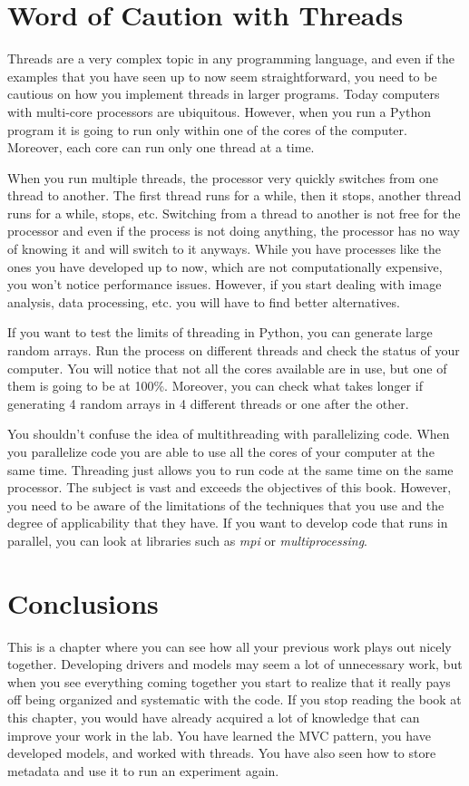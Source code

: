 \section{Word of Caution with Threads}\label{word-of-caution-withthreads}

Threads are a very complex topic in any programming language, and even
if the examples that you have seen up to now seem straightforward, you
need to be cautious on how you implement threads in larger programs.
Today computers with multi-core processors are ubiquitous. However, when
you run a Python program it is going to run only within one of the cores
of the computer. Moreover, each core can run only one thread at a time.

When you run multiple threads, the processor very quickly switches from
one thread to another. The first thread runs for a while, then it stops,
another thread runs for a while, stops, etc. Switching from a thread to
another is not free for the processor and even if the process is not
doing anything, the processor has no way of knowing it and will switch
to it anyways. While you have processes like the ones you have developed
up to now, which are not computationally expensive, you won't notice
performance issues. However, if you start dealing with image analysis,
data processing, etc. you will have to find better alternatives.

If you want to test the limits of threading in Python, you can generate
large random arrays. Run the process on different threads and check the
status of your computer. You will notice that not all the cores
available are in use, but one of them is going to be at 100\%. Moreover,
you can check what takes longer if generating 4 random arrays in 4
different threads or one after the other.

You shouldn't confuse the idea of multithreading with parallelizing
code. When you parallelize code you are able to use all the cores of
your computer at the same time. Threading just allows you to run code at
the same time on the same processor. The subject is vast and exceeds the
objectives of this book. However, you need to be aware of the
limitations of the techniques that you use and the degree of
applicability that they have. If you want to develop code that runs in
parallel, you can look at libraries such as \emph{mpi} or
\emph{multiprocessing}.

\section{Conclusions}\label{conclusions}
This is a chapter where you can see how all your previous work plays out
nicely together. Developing drivers and models may seem a lot of
unnecessary work, but when you see everything coming together you start
to realize that it really pays off being organized and systematic with
the code. If you stop reading the book at this chapter, you would have
already acquired a lot of knowledge that can improve your work in the
lab. You have learned the {MVC} pattern, you have developed models, and
worked with threads. You have also seen how to store metadata and use it
to run an experiment again.

